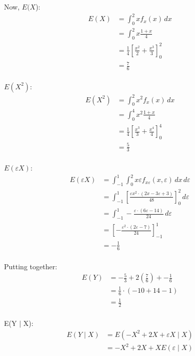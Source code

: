 \documentclass{article}
\begin{document}
Now, $E(X$):
\begin{align*}
    E(X)
    &= \int_{0}^{2}xf_{x}(x) \,dx \\
    &= \int_{0}^{2}x \frac{1+x}{4}\\
    &= \frac{1}{4} \left[\frac{x^2}{2} + \frac{x^3}{3} \right]_{0}^{2}\\
    &= \frac{7}{6}\\
\end{align*}

$E(X^2)$:
\begin{align*}
    E(X^2)
    &= \int_{0}^{2}x^2 f_{x}(x) \,dx \\
    &= \int_{0}^{4}x^2 \frac{1+x}{4}\\
    &= \frac{1}{4} \left[\frac{x^3}{3} + \frac{x^4}{4} \right]_{0}^{4}\\
    &= \frac{5}{3}\\
\end{align*}

$E(\varepsilon X)$:
\begin{align*}
    E(\varepsilon X)
    &= \int_{-1}^{1}\int_{0}^{2}x\varepsilon f_{x \varepsilon}(x, \varepsilon) \,dx \,d\varepsilon\\
    &= \int_{-1}^{1} \left[\frac{\varepsilon x^2\cdot\left(2x-3\varepsilon+3\right)}{48} \right]_{0}^{2} \,d\varepsilon\\
    &= \int_{-1}^{1} -\frac{\varepsilon \cdot\left(6\varepsilon -14\right)}{24} \,d\varepsilon\\
    &= \left[-\frac{\varepsilon ^2\cdot\left(2 \varepsilon -7\right)}{24} \right]_{-1}^{1}\\
    &= -\frac{1}{6}\\
\end{align*}

Putting together:
\begin{align*}
    E(Y)
    &= -\frac{5}{3} + 2\left(\frac{7}{6}\right) + -\frac{1}{6}\\
    &= \frac{1}{6} \cdot \left(-10 + 14 - 1\right) \\
    &= \frac{1}{2}\\
\end{align*}

E(Y $\mid$ X):
\begin{align*}
    E(Y \mid X)
    &= E(-X^2 + 2X + \varepsilon X \mid X)\\
    &= -X^2 + 2X + XE(\varepsilon \mid X)\\
\end{align*}
\end{document}
